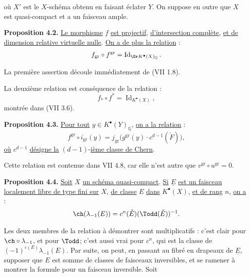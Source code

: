 
où \(X'\) est le \(X\)-schéma
obtenu en faisant éclater \(Y\). On suppose en outre que \(X\) est quasi-compact et a un faisceau ample.

\textbf{Proposition 4.2.} \uline{Le morphisme} \(f\) \uline{est projectif}, \uline{d'intersection complète}, \uline{et de dimension relative virtuelle nulle}. \uline{On a de plus la relation} :
\[
 f_{\mathrm{gr}}\circ f^{\mathrm{gr}}=\operatorname{Id}_{\Gr K^{\bullet}(X)_{\mathbb Q}} .
\]

La première assertion découle immédiatement de (VII 1.8).

La deuxième relation est conséquence de la relation :
\[
 f_*\circ f^*=\operatorname{Id}_{K^{\bullet}(X)},
\]
montrée dans (VII 3.6).

\textbf{Proposition 4.3.} \uline{Pour tout} \(y\in K^{\bullet}(Y)_{\mathbb Q}\), \uline{on a la relation} :
\[
 f^{\mathrm{gr}}\circ i_{\mathrm{gr}}(y)
 =
 j_{\mathrm{gr}}\bigl(g^{\mathrm{gr}}(y)\cdot c^{d-1}(\check F)\bigr),
\]
\uline{où} \(c^{d-1}\) \uline{désigne la} \((d-1)\)-\uline{ième classe de Chern}.

Cette relation est contenue dans VII 4.8, car elle n'est autre que \(v^{\mathrm{gr}}\circ u^{\mathrm{gr}}=0\).

\textbf{Proposition 4.4.} \uline{Soit} \(X\) \uline{un schéma quasi-compact}. \uline{Si} \(\underline{E}\) \uline{est un faisceau localement libre de type fini sur} \(X\), \uline{de classe} \(E\) \uline{dans} \(K^{\bullet}(X)\), \uline{et de rang} \(n\), \uline{on a} :
\[
 \ch(\lambda_{-1}(E))=c^n(\check E)(\Todd(\check E))^{-1}.
\]

Les deux membres de la relation à démontrer sont multiplicatifs : c'est clair pour \(\ch\circ\lambda_{-1}\), et pour \(\Todd\); c'est aussi vrai pour \(c^n\), qui est la classe de \((-1)^{\varepsilon(E)}\lambda_{-1}(E)\). Par suite, on peut, en passant au fibré en drapeaux de \(\underline{E}\), supposer que \(E\) est somme de classes de faisceaux inversibles, et se ramener à montrer la formule pour un faisceau inversible. Soit
